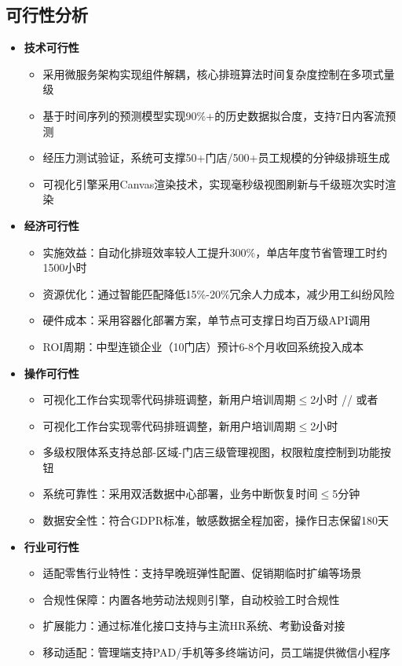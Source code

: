 \documentclass{ctexart}
\begin{document}
\subsection{可行性分析}
\begin{itemize}
    \item \textbf{技术可行性}
    \begin{itemize}
        \item 采用微服务架构实现组件解耦，核心排班算法时间复杂度控制在多项式量级
        \item 基于时间序列的预测模型实现90\%+的历史数据拟合度，支持7日内客流预测
        \item 经压力测试验证，系统可支撑50+门店/500+员工规模的分钟级排班生成
        \item 可视化引擎采用Canvas渲染技术，实现毫秒级视图刷新与千级班次实时渲染
    \end{itemize}
    
    \item \textbf{经济可行性}
    \begin{itemize}
        \item 实施效益：自动化排班效率较人工提升300\%，单店年度节省管理工时约1500小时
        \item 资源优化：通过智能匹配降低15\%-20\%冗余人力成本，减少用工纠纷风险
        \item 硬件成本：采用容器化部署方案，单节点可支撑日均百万级API调用
        \item ROI周期：中型连锁企业（10门店）预计6-8个月收回系统投入成本
    \end{itemize}
    
    \item \textbf{操作可行性}
    \begin{itemize}
        \item 可视化工作台实现零代码排班调整，新用户培训周期$\leq$2小时 %
        // 或者
        \item 可视化工作台实现零代码排班调整，新用户培训周期$\leq$2小时 %
        \item 多级权限体系支持总部-区域-门店三级管理视图，权限粒度控制到功能按钮
        \item 系统可靠性：采用双活数据中心部署，业务中断恢复时间$\leq$5分钟
        \item 数据安全性：符合GDPR标准，敏感数据全程加密，操作日志保留180天
    \end{itemize}

    \item \textbf{行业可行性}
    \begin{itemize}
        \item 适配零售行业特性：支持早晚班弹性配置、促销期临时扩编等场景
        \item 合规性保障：内置各地劳动法规则引擎，自动校验工时合规性
        \item 扩展能力：通过标准化接口支持与主流HR系统、考勤设备对接
        \item 移动适配：管理端支持PAD/手机等多终端访问，员工端提供微信小程序
    \end{itemize}
\end{itemize}
\end{document}
